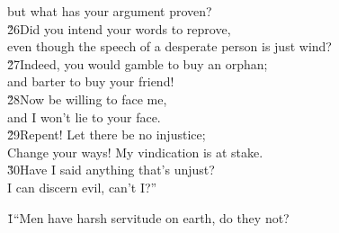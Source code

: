 \begin{poetry}
\poemll    but what has your argument proven? \\
\poeml \v{26}Did you intend your words to reprove, \\
\poemll    even though the speech of a desperate person is just wind? \\
\poeml \v{27}Indeed, you would gamble to buy an orphan; \\
\poemll    and barter to buy your friend! \\
\poeml \v{28}Now be willing to face me, \\
\poemll    and I won't lie to your face. \\
\poeml \v{29}Repent! Let there be no injustice; \\
\poemll    Change your ways! My vindication is at stake. \\
\poeml \v{30}Have I said anything that's unjust? \\
\poemll    I can discern evil, can't I?''
\end{poetry}

\v{1}``Men have harsh servitude on earth, do they not?

